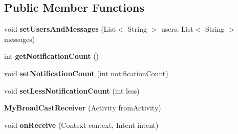 \subsection*{Public Member Functions}
\begin{DoxyCompactItemize}
\item 
void {\bfseries set\+Users\+And\+Messages} (List$<$ String $>$ users, List$<$ String $>$ messages)\hypertarget{classcom_1_1example_1_1sebastian_1_1tindertp_1_1services_1_1MyBroadCastReceiver_a49c7ab5eba0bc6d06b028f508a050832}{}\label{classcom_1_1example_1_1sebastian_1_1tindertp_1_1services_1_1MyBroadCastReceiver_a49c7ab5eba0bc6d06b028f508a050832}

\item 
int {\bfseries get\+Notification\+Count} ()\hypertarget{classcom_1_1example_1_1sebastian_1_1tindertp_1_1services_1_1MyBroadCastReceiver_a2f4590e5d58a5dbdf46453d0d9efdf81}{}\label{classcom_1_1example_1_1sebastian_1_1tindertp_1_1services_1_1MyBroadCastReceiver_a2f4590e5d58a5dbdf46453d0d9efdf81}

\item 
void {\bfseries set\+Notification\+Count} (int notification\+Count)\hypertarget{classcom_1_1example_1_1sebastian_1_1tindertp_1_1services_1_1MyBroadCastReceiver_a71c13597cf872f0ec9e406134f298a2b}{}\label{classcom_1_1example_1_1sebastian_1_1tindertp_1_1services_1_1MyBroadCastReceiver_a71c13597cf872f0ec9e406134f298a2b}

\item 
void {\bfseries set\+Less\+Notification\+Count} (int less)\hypertarget{classcom_1_1example_1_1sebastian_1_1tindertp_1_1services_1_1MyBroadCastReceiver_af0494b30815a3e735603190969622747}{}\label{classcom_1_1example_1_1sebastian_1_1tindertp_1_1services_1_1MyBroadCastReceiver_af0494b30815a3e735603190969622747}

\item 
{\bfseries My\+Broad\+Cast\+Receiver} (Activity from\+Activity)\hypertarget{classcom_1_1example_1_1sebastian_1_1tindertp_1_1services_1_1MyBroadCastReceiver_a020fb63e7974ce06c241d7bce026be68}{}\label{classcom_1_1example_1_1sebastian_1_1tindertp_1_1services_1_1MyBroadCastReceiver_a020fb63e7974ce06c241d7bce026be68}

\item 
void {\bfseries on\+Receive} (Context context, Intent intent)\hypertarget{classcom_1_1example_1_1sebastian_1_1tindertp_1_1services_1_1MyBroadCastReceiver_aaed0960fbf1636d24867ce0a282ddba7}{}\label{classcom_1_1example_1_1sebastian_1_1tindertp_1_1services_1_1MyBroadCastReceiver_aaed0960fbf1636d24867ce0a282ddba7}

\end{DoxyCompactItemize}
